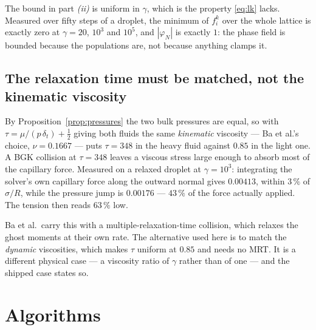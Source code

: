 \documentclass[11pt,a4paper]{article}
\theoremstyle{plain}
\theoremstyle{definition}
\begin{document}
The bound in part \emph{(ii)} is uniform in $\gamma$, which is the property
\eqref{eq:lk} lacks. Measured over fifty steps of a droplet, the minimum of
$f_i^k$ over the whole lattice is exactly zero at $\gamma = 20$, $10^3$ and
$10^5$, and $|\varphi_N|$ is exactly $1$: the phase field is bounded because the
populations are, not because anything clamps it.

\subsection{The relaxation time must be matched, not the kinematic viscosity}
\label{sec:viscosity}

By Proposition~\ref{prop:pressures} the two bulk pressures are equal, so with
$\tau = \mu/(p\,\delta_t) + \tfrac12$ giving both fluids the same
\emph{kinematic} viscosity --- Ba et al.'s choice, $\nu = 0.1667$ --- puts
$\tau = 348$ in the heavy fluid against $0.85$ in the light one. A BGK collision
at $\tau = 348$ leaves a viscous stress large enough to absorb most of the
capillary force. Measured on a relaxed droplet at $\gamma = 10^3$: integrating
the solver's own capillary force along the outward normal gives $0.00413$,
within $3\,\%$ of $\sigma/R$, while the pressure jump is $0.00176$ --- $43\,\%$
of the force actually applied. The tension then reads $63\,\%$ low.

Ba et al.\ carry this with a multiple-relaxation-time collision, which relaxes
the ghost moments at their own rate. The alternative used here is to match the
\emph{dynamic} viscosities, which makes $\tau$ uniform at $0.85$ and needs no
MRT. It is a different physical case --- a viscosity ratio of $\gamma$ rather
than of one --- and the shipped case states so.

\section{Algorithms}
\end{document}
